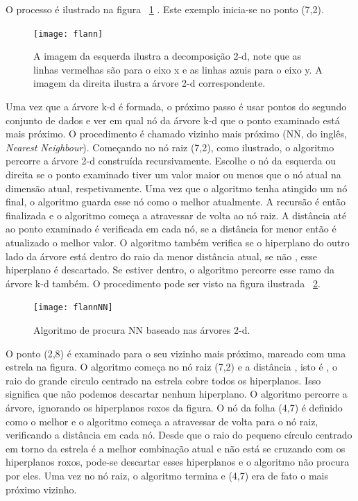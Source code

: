 O processo é ilustrado na figura ~\ref{fig:flann} . Este exemplo inicia-se no ponto (7,2).

\begin{figure}[h!] %
	\begin{center}
		\leavevmode		
		\texttt{[image: flann]}
		\caption{A imagem da esquerda ilustra a decomposição 2-d, note que as linhas vermelhas são para o eixo x e as linhas azuis para o eixo y. A imagem da direita ilustra a árvore 2-d correspondente.}
		\label{fig:flann}
	\end{center}
\end{figure}

Uma vez que a árvore k-d é formada, o próximo passo é usar pontos do segundo conjunto de dados e ver em qual nó da árvore k-d que o ponto examinado está mais próximo. O procedimento é chamado vizinho mais próximo (NN, do inglês, \textit{Nearest Neighbour}). Começando no nó raiz (7,2), como ilustrado, o algoritmo percorre a árvore 2-d construída recursivamente. Escolhe o nó da esquerda ou direita se o ponto examinado tiver um valor maior ou menos que o nó atual na dimensão atual, respetivamente. Uma vez que o algoritmo tenha atingido um nó final, o algoritmo guarda esse nó como o melhor atualmente. A recursão é então finalizada e o algoritmo começa a atravessar de volta ao nó raiz. A distância até ao ponto examinado é verificada em cada nó, se a distância for menor então é atualizado o melhor valor. O algoritmo também verifica se o hiperplano do outro lado da árvore está dentro do raio da menor distância atual, se não , esse hiperplano é descartado. Se estiver dentro, o algoritmo percorre esse ramo da árvore k-d também. O procedimento pode ser visto na figura ilustrada ~\ref{fig:flannNN}.

\begin{figure}[h!] %
	\begin{center}
		\leavevmode		
		\texttt{[image: flannNN]}
		\caption{Algoritmo de procura NN baseado nas árvores 2-d.}
		\label{fig:flannNN}
	\end{center}
\end{figure}

O ponto (2,8) é examinado para o seu vizinho mais próximo, marcado com uma estrela na figura. O algoritmo começa no nó raiz (7,2) e a distância , isto é , o raio do grande circulo centrado na estrela cobre todos os hiperplanos. Isso significa que não podemos descartar nenhum hiperplano. O algoritmo percorre a árvore, ignorando os hiperplanos roxos da figura. O nó da folha (4,7) é definido como o melhor e o algoritmo começa a atravessar de volta para o nó raiz, verificando a distância em cada nó. Desde que o raio do pequeno círculo centrado em torno da estrela é a melhor combinação atual e não está se cruzando com os hiperplanos roxos, pode-se descartar esses hiperplanos e o algoritmo não procura por eles. Uma vez no nó raiz, o algoritmo termina e (4,7) era de fato o mais próximo vizinho.

